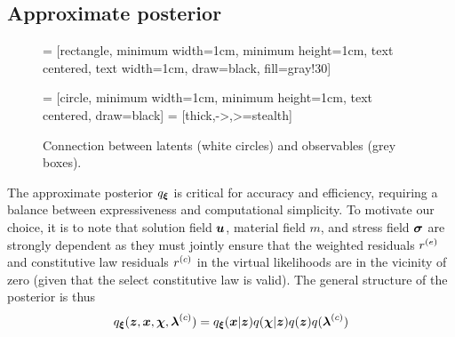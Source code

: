 \subsection{Approximate posterior} \label{subsec:q}
\begin{figure}
    \centering
     = [rectangle, 
    minimum width=1cm, 
    minimum height=1cm, 
    text centered, 
    text width=1cm, 
    draw=black, 
    fill=gray!30]
    
     = [circle, 
    minimum width=1cm, 
    minimum height=1cm, 
    text centered, 
    draw=black]
     = [thick,->,>=stealth]
    
    \caption{Connection between latents (white circles) and observables (grey boxes).}
    \label{fig:chart}
\end{figure}

The approximate posterior $q_{\boldsymbol{\xi}}$ is critical for accuracy and efficiency, requiring a balance between expressiveness and computational simplicity. To motivate our choice, it is to note that solution field $\boldsymbol{u}$, material field $m$, and stress field $\boldsymbol{\sigma}$ are strongly dependent as they must jointly ensure that the weighted residuals $r^{(e)}$ and constitutive law residuals $r^{(c)}$ in the virtual likelihoods are in the vicinity of zero (given that the select constitutive law is valid). The general structure of the posterior is thus
\begin{equation}
    q_{\boldsymbol{\xi}}(\boldsymbol{z}, \boldsymbol{x}, \boldsymbol{\chi}, \boldsymbol{\lambda}^{(c)}) = q_{\boldsymbol{\xi}}(\boldsymbol{x} | \boldsymbol{z}) q(\boldsymbol{\chi} | \boldsymbol{z}) q(\boldsymbol{z}) q(\boldsymbol{\lambda}^{(c)})
\end{equation}

